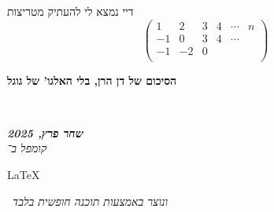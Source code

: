 \documentclass[]{article}
\newcommand\en[1] {\begin{otherlanguage}{english}#1\end{otherlanguage}}
\newcommand\ndoc  {\dotfill \\ \vfil {\begin{center}
            {\textbf{\textit{שחר פרץ, 2025}} \\
                \scriptsize \textit{קומפל ב־}\en{\LaTeX}\,\textit{ ונוצר באמצעות תוכנה חופשית בלבד}}
    \end{center}} \vfil	}
\newcommand\pms[1]    {\begin{pmatrix}
        #1
\end{pmatrix}}
\theoremstyle{definition}
\begin{document}
    \subsubsection{}
    דיי נמצא לי להעתיק מטריצות
    \[ \pms{1 & 2 & 3 & 4 & \cdots & n \\ -1 & 0 & 3 & 4&\cdots \\ -1 & -2 & 0 & \\ } \]
    
    
    \textbf{הסיכום של דן הרן, בלי האלגו' של גוגל}
    
    
    \ndoc
\end{document}
